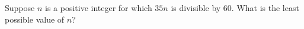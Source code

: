 Suppose $n$ is a positive integer for which $35n$ is divisible by $60$. What is the least possible value of $n$?
